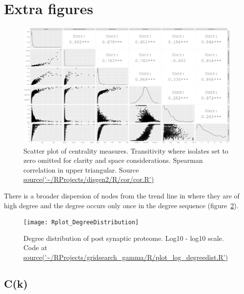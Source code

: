 \section{Extra figures}
\begin{figure} 
    \centering
    \includegraphics[width=\textwidth]{images/chapter3/cor_pairs/ggally/Rplot_corr_plot_ggally_large_size_11.png}
    \caption{Scatter plot of centrality measures. Transitivity where isolates set to zero omitted for clarity and space considerations. Spearman correlation in upper triangular. Source \url{source('~/RProjects/disgen2/R/cor/cor.R')}}
    \label{fig:scatter plot of multiple centralities gg ally}
\end{figure}
There is a broader dispersion of nodes from the trend line in where they are of high degree and the degree occurs only once in the degree sequence (figure~\ref{fig:Degree distribution of post synaptic proteome. Log10 - log10 scale.}).

\begin{figure}
    \texttt{[image: Rplot\_DegreeDistribution]}
    \caption{Degree distribution of post synaptic proteome. Log10 - log10 scale. Code at \url{source('~/RProjects/gridsearch_gamma/R/plot_log_degreedist.R') }}
    \label{fig:Degree distribution of post synaptic proteome. Log10 - log10 scale.}
\end{figure}



\subsection{C(k)}

